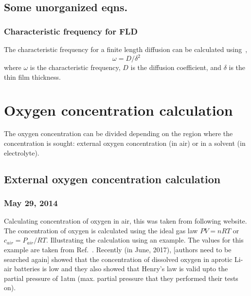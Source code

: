 \documentclass[12pt]{book}
\begin{document}
\section{Some unorganized eqns.}
\subsection{Characteristic frequency for FLD}
The characteristic frequency for a finite length diffusion can be calculated using~\cite{Springer1989},
\begin{equation}
\omega = D/\delta^2
\end{equation}
where $\omega$ is the characteristic frequency, $D$ is the diffusion coefficient, and $\delta$ is the thin film thickness.

\chapter{Oxygen concentration calculation}
The oxygen concentration can be divided depending on the region where the concentration is sought: external oxygen concentration (in air) or in a solvent (in electrolyte).

\section{External oxygen concentration calculation}
\subsection*{May 29, 2014}
Calculating concentration of oxygen in air, this was taken from following website\cite{Chuang2013}. The concentration of oxygen is calculated using the ideal gas law $PV=nRT$ or $c_{air}=P_{air}/RT$. Illustrating the calculation using an example. The values for this example are taken from Ref.~\cite{Adams2013}. Recently (in June, 2017), [authors need to be searched again] showed that the concentration of dissolved oxygen in aprotic Li-air batteries is low and they also showed that Henry's law is valid upto the partial pressure of 1atm (max. partial pressure that they performed their tests on). 
\end{document}
